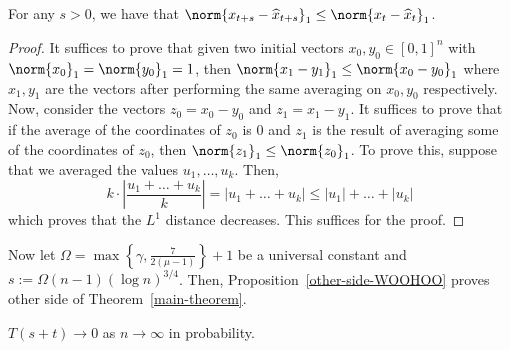 \documentclass[12pt]{article}
\begin{document}
\begin{lem}
	For any $s > 0$, we have that $\norm{x_{t+s} - \widehat{x}_{t+s}}_1 \leq \norm{x_t - \widehat{x}_t}_1$. 
\end{lem}
\begin{proof}
	It suffices to prove that given two initial vectors $x_0, y_0 \in [0, 1]^n$ with $\norm{x_0}_1 =\norm{y_0}_1 = 1$, then $\norm{x_1 - y_1}_1 \leq \norm{x_0 - y_0}_1$ where  $x_1, y_1$ are the vectors after performing the same averaging on $x_0, y_0$ respectively. Now, consider the vectors $z_0 = x_0 - y_0$ and $z_1 = x_1 - y_1$. It suffices to prove that if the average of the coordinates of $z_0$ is $0$ and $z_1$ is the result of averaging some of the coordinates of $z_0$, then $\norm{z_1}_1 \leq \norm{z_0}_1$. To prove this, suppose that we averaged the values $u_1, \ldots, u_k$. Then,
	\[
		k \cdot \left | \frac{u_1 + \ldots + u_k}{k} \right | = |u_1 + \ldots + u_k| \leq |u_1| + \ldots + |u_k|
	\]
	which proves that the $L^1$ distance decreases. This suffices for the proof. 
	\end{proof}

Now let $\Omega = \max \left \{\gamma, \frac{7}{2(\mu -1)} \right \} + 1$ be a universal constant and $s := \Omega (n-1) (\log n)^{3/4}$. Then, Proposition~\ref{other-side-WOOHOO} proves other side of Theorem~\ref{main-theorem}.

\begin{prop} \label{other-side-WOOHOO}
	$T(s+t) \to 0$ as $n \to \infty$ in probability. 
\end{prop}
\end{document}

